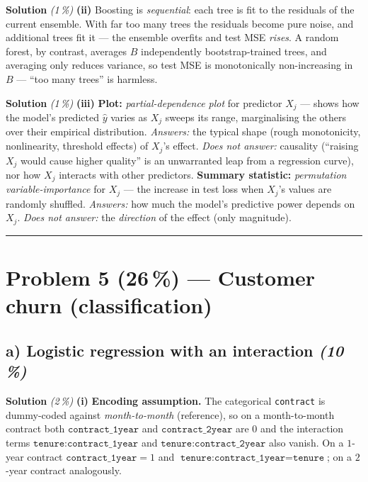 \documentclass[11pt,a4paper]{article}
\newcommand{\points}[1]{\textbf{(#1\,\%)}}
\newcommand{\subpoints}[1]{\textit{(#1\,\%)}}
\newcommand{\sol}{\noindent\textbf{Solution}}
\begin{document}
\medskip
\sol{} \subpoints{1} \textbf{(ii)} Boosting is \emph{sequential}: each tree is fit to the residuals
of the current ensemble. With far too many trees the residuals become pure noise, and additional
trees fit it --- the ensemble overfits and test MSE \emph{rises}. A random forest, by contrast,
averages $B$ independently bootstrap-trained trees, and averaging only reduces variance, so test
MSE is monotonically non-increasing in $B$ --- ``too many trees'' is harmless.

\medskip
\sol{} \subpoints{1} \textbf{(iii)} \textbf{Plot:} \emph{partial-dependence plot} for predictor $X_j$
--- shows how the model's predicted $\hat y$ varies as $X_j$ sweeps its range, marginalising the
others over their empirical distribution. \emph{Answers:} the typical shape (rough monotonicity,
nonlinearity, threshold effects) of $X_j$'s effect. \emph{Does not answer:} causality
(``raising $X_j$ would cause higher quality'' is an unwarranted leap from a regression curve), nor
how $X_j$ interacts with other predictors. \textbf{Summary statistic:} \emph{permutation
variable-importance} for $X_j$ --- the increase in test loss when $X_j$'s values are randomly
shuffled. \emph{Answers:} how much the model's predictive power depends on $X_j$. \emph{Does not
answer:} the \emph{direction} of the effect (only magnitude).

\vspace{0.6em}
\hrule
\vspace{1em}

\section*{Problem 5 \points{26} --- Customer churn (classification)}

\subsection*{a) Logistic regression with an interaction \subpoints{10}}

\sol{} \subpoints{2} \textbf{(i)} \textbf{Encoding assumption.} The categorical \texttt{contract} is
dummy-coded against \emph{month-to-month} (reference), so on a month-to-month contract both
$\texttt{contract\_1year}$ and $\texttt{contract\_2year}$ are $0$ and the interaction terms
$\texttt{tenure:contract\_1year}$ and $\texttt{tenure:contract\_2year}$ also vanish. On a $1$-year
contract $\texttt{contract\_1year}=1$ and $\texttt{tenure:contract\_1year}=\texttt{tenure}$; on a
$2$-year contract analogously.
\end{document}
